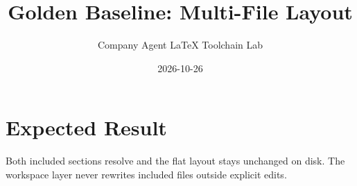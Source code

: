 \documentclass[11pt]{article}
\begin{document}
\title{Golden Baseline: Multi-File Layout}
\author{Company Agent LaTeX Toolchain Lab}
\date{2026-10-26}
\maketitle




\section{Expected Result}
Both included sections resolve and the flat layout stays unchanged on disk.
The workspace layer never rewrites included files outside explicit edits.
\end{document}
